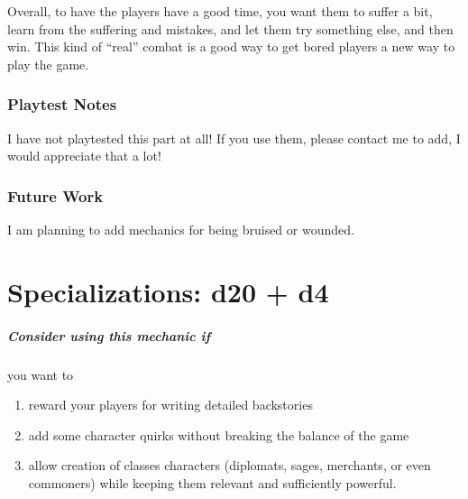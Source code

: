 \documentclass[twocolumn]{dndbook}
\begin{document}
Overall, to have the players have a good time, you want them to suffer a bit,
learn from the suffering and mistakes, and let them try something else, and then
win. This kind of ``real'' combat is a good way to get bored players a new
way to play the game.\par





\subsection{Playtest Notes}

I have not playtested this part at all! If you use them, please contact me to add, I would appreciate that a lot!




\subsection{Future Work}
I am planning to add mechanics for being bruised or wounded.





\chapter{Specializations: d20 + d4}
\label{chap:d20_plus_d4}

\begin{emphasisParagraph}
	\paragraph*{Consider using this mechanic if} you want to
	\begin{enumerate}
    \item reward your players for writing detailed backstories
    \item add some character quirks without breaking the balance of the game
    \item allow creation of classes characters (diplomats, sages, merchants, or even commoners) while keeping them relevant and sufficiently powerful.
    \end{enumerate}
\end{emphasisParagraph}
\end{document}
